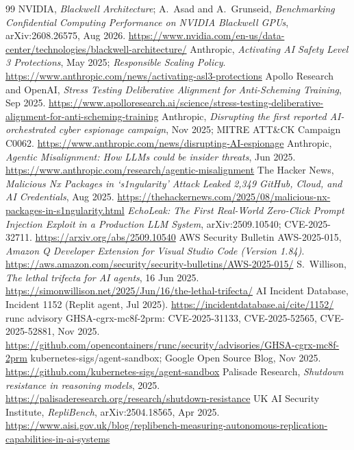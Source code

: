 \documentclass[11pt,letterpaper]{article}
\begin{document}
\begin{thebibliography}{99}
 NVIDIA, \emph{Blackwell Architecture}; A.~Asad and A.~Grunseid, \emph{Benchmarking Confidential Computing Performance on NVIDIA Blackwell GPUs}, arXiv:2608.26575, Aug 2026. \url{https://www.nvidia.com/en-us/data-center/technologies/blackwell-architecture/}
 Anthropic, \emph{Activating AI Safety Level 3 Protections}, May 2025; \emph{Responsible Scaling Policy}. \url{https://www.anthropic.com/news/activating-asl3-protections}
 Apollo Research and OpenAI, \emph{Stress Testing Deliberative Alignment for Anti-Scheming Training}, Sep 2025. \url{https://www.apolloresearch.ai/science/stress-testing-deliberative-alignment-for-anti-scheming-training}
 Anthropic, \emph{Disrupting the first reported AI-orchestrated cyber espionage campaign}, Nov 2025; MITRE ATT\&CK Campaign C0062. \url{https://www.anthropic.com/news/disrupting-AI-espionage}
 Anthropic, \emph{Agentic Misalignment: How LLMs could be insider threats}, Jun 2025. \url{https://www.anthropic.com/research/agentic-misalignment}
 The Hacker News, \emph{Malicious Nx Packages in `s1ngularity' Attack Leaked 2,349 GitHub, Cloud, and AI Credentials}, Aug 2025. \url{https://thehackernews.com/2025/08/malicious-nx-packages-in-s1ngularity.html}
 \emph{EchoLeak: The First Real-World Zero-Click Prompt Injection Exploit in a Production LLM System}, arXiv:2509.10540; CVE-2025-32711. \url{https://arxiv.org/abs/2509.10540}
 AWS Security Bulletin AWS-2025-015, \emph{Amazon Q Developer Extension for Visual Studio Code (Version 1.84)}. \url{https://aws.amazon.com/security/security-bulletins/AWS-2025-015/}
 S.~Willison, \emph{The lethal trifecta for AI agents}, 16 Jun 2025. \url{https://simonwillison.net/2025/Jun/16/the-lethal-trifecta/}
 AI Incident Database, Incident 1152 (Replit agent, Jul 2025). \url{https://incidentdatabase.ai/cite/1152/}
 runc advisory GHSA-cgrx-mc8f-2prm: CVE-2025-31133, CVE-2025-52565, CVE-2025-52881, Nov 2025. \url{https://github.com/opencontainers/runc/security/advisories/GHSA-cgrx-mc8f-2prm}
 kubernetes-sigs/agent-sandbox; Google Open Source Blog, Nov 2025. \url{https://github.com/kubernetes-sigs/agent-sandbox}
 Palisade Research, \emph{Shutdown resistance in reasoning models}, 2025. \url{https://palisaderesearch.org/research/shutdown-resistance}
 UK AI Security Institute, \emph{RepliBench}, arXiv:2504.18565, Apr 2025. \url{https://www.aisi.gov.uk/blog/replibench-measuring-autonomous-replication-capabilities-in-ai-systems}

\end{thebibliography}
\end{document}
